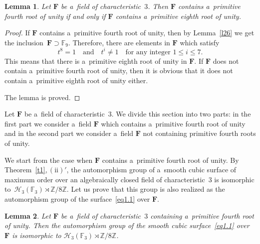 \documentclass{amsart}
\numberwithin{equation}{section}
\theoremstyle{plain}
\newtheorem{lemma}{Lemma}
\theoremstyle{definition}
\theoremstyle{remark}
\begin{document}
\begin{lemma}
\label{l27}
Let $\mathbf{F}$ be a~field of characteristic~$3$. Then $\mathbf{F}$ contains a~primitive fourth root of unity if and only if\/ $\mathbf{F}$ contains a~primitive eighth root of unity.
\end{lemma}

\begin{proof}
If $\mathbf{F}$ contains a~primitive fourth root of unity, then by Lemma~\ref{l26} we get the inclusion~\mbox{$\mathbf{F} \supset \mathbb{F}_9$.} Therefore, there are elements in $\mathbf{F}$ which satisfy
$$
t^8=1
\quad \text{and}\quad t^i \neq 1
\quad \text{for any integer } 1 \leqslant i \leqslant 7.
$$
This means that there is a~primitive eighth root of unity in $\mathbf{F}$. If $\mathbf{F}$ does not contain a~primitive fourth root of unity, then it is obvious that it does not contain a~primitive eighth root of unity either.

The lemma is proved.
\end{proof}

Let $\mathbf{F}$ be a~field of characteristic~$3$. We divide this section into two parts: in the first part we consider a~field $\mathbf{F}$ which contains a~primitive fourth root of unity and in the second part we consider a~field $\mathbf{F}$ not containing primitive fourth roots of unity.

We start from the case when $\mathbf{F}$ contains a~primitive fourth root of unity. By Theorem~\ref{t1},\,$(\mathrm{ii})'$, the automorphism group of a~smooth cubic surface of maximum order over an algebraically closed field of characteristic~$3$ is isomorphic to~\mbox{$\mathcal{H}_3(\mathbb{F}_3) \rtimes \mathbb{Z}/8\mathbb{Z}$.}
Let us prove that this group is also realized as the automorphism group of the surface~\eqref{eq1.1} over $\mathbf{F}$.

\begin{lemma}
\label{l28}
Let $\mathbf{F}$ be a~field of characteristic~$3$ containing a~primitive fourth root of unity. Then the automorphism group of the smooth cubic surface~\eqref{eq1.1} over~$\mathbf{F}$ is isomorphic to $\mathcal{H}_3(\mathbb{F}_3) \rtimes \mathbb{Z}/8\mathbb{Z}$.
\end{lemma}
\end{document}
